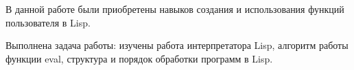 
В данной работе были приобретены навыков создания и использования функций пользователя в Lisp.

Выполнена задача работы: изучены работа интерпретатора Lisp, алгоритм работы функции eval, структура и порядок обработки программ в Lisp.
